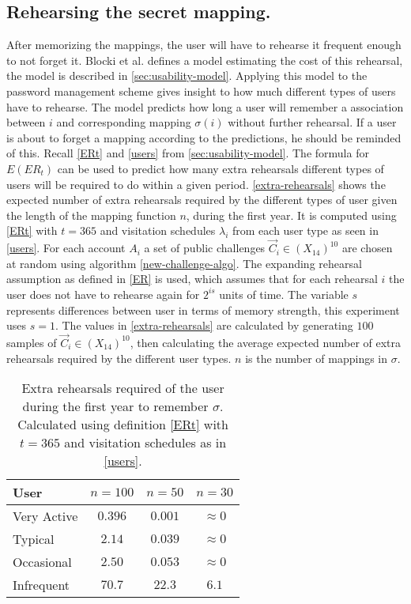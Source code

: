 \subsection{Rehearsing the secret mapping.}
After memorizing the mappings, the user will have to rehearse it frequent enough to not forget it. Blocki et al. \cite{naturally-rehearsing} defines a model estimating the cost of this rehearsal, the model is described in \autoref{sec:usability-model}. Applying this model to the password management scheme gives insight to how much different types of users have to rehearse. The model predicts how long a user will remember a association between $i$ and corresponding mapping $\sigma(i)$ without further rehearsal. If a user is about to forget a mapping according to the predictions, he should be reminded of this. Recall \autoref{ERt} and \autoref{users} from \autoref{sec:usability-model}. The formula for $E(ER_t)$ can be used to predict how many extra rehearsals different types of users will be required to do within a given period. \autoref{extra-rehearsals} shows the expected number of extra rehearsals required by the different types of user given the length of the mapping function $n$, during the first year. It is computed using \autoref{ERt} with $t=365$ and visitation schedules $\lambda_i$ from each user type as seen in \autoref{users}. For each account $A_i$ a set of public challenges $\vec C_i \in (X_{14})^{10}$ are chosen at random using algorithm \ref{new-challenge-algo}. The expanding rehearsal assumption as defined in \ref{ER} is used, which assumes that for each rehearsal $i$ the user does not have to rehearse again for $2^{is}$ units of time. The variable $s$ represents differences between user in terms of memory strength, this experiment uses $s=1$. The values in \autoref{extra-rehearsals} are calculated by generating $100$ samples of $\vec C_i \in (X_{14})^{10}$, then calculating the average expected number of extra rehearsals required by the different user types. $n$ is the number of mappings in $\sigma$.

\begin{table}
    \centering
    \begin{tabular}{ |l|c|c|c| }
        \hline
        User & $n=100$ & $n=50$ & $n=30$ \\
        \hline \hline
        Very Active & $0.396$ & $0.001$ & $\approx 0$ \\
        \hline
        Typical & $2.14$ & $0.039$ & $\approx 0$ \\
        \hline
        Occasional & $2.50$ & $0.053$ & $\approx 0 $  \\
        \hline
        Infrequent & $70.7$ & $22.3$ & $6.1$ \\
        \hline

    \end{tabular}
    \caption{\cite{hcp-blocki} Extra rehearsals required of the user during the first year to remember $\sigma$. Calculated using definition \ref{ERt} with $t=365$ and visitation schedules as in \autoref{users}.}
    \label{extra-rehearsals}
\end{table}

